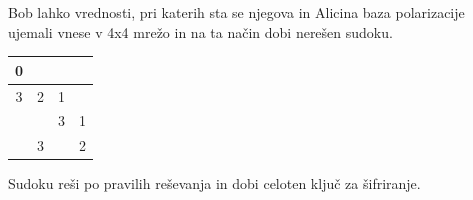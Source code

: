 \documentclass[A4paper, 11pt]{article}
\begin{document}
Bob lahko vrednosti, pri katerih sta se njegova in Alicina baza polarizacije ujemali vnese v 4x4 mrežo in na ta način dobi nerešen sudoku.

\begin{center}
\begin{tabular}{| c | c || c | c |}
\hline
0 & & & \\
\hline
3 & 2 & 1 & \\
\hline
\hline
& & 3 & 1\\
\hline
& 3 & & 2\\
\hline
\end{tabular}
\end{center}

Sudoku reši po pravilih reševanja in dobi celoten ključ za šifriranje.
\end{document}

